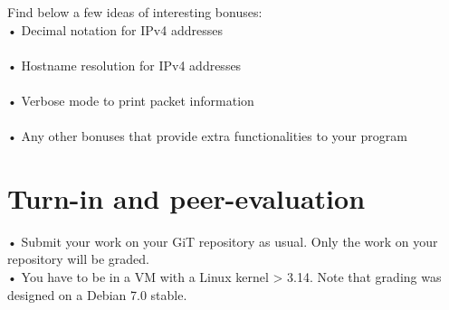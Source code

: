 \documentclass{42-en}
\begin{document}
Find below a few ideas of interesting bonuses:\\
  
• Decimal notation for IPv4 addresses\\
\\  
• Hostname resolution for IPv4 addresses\\
\\  
• Verbose mode to print packet information\\
\\  
• Any other bonuses that provide extra functionalities to your program\\


\chapter{Turn-in and peer-evaluation}

        • Submit your work on your GiT repository as usual. Only the work on your repository will be graded.\\
        \newline
        • You have to be in a VM with a Linux kernel > 3.14. Note that grading was designed on a Debian 7.0 stable.



\end{document}
